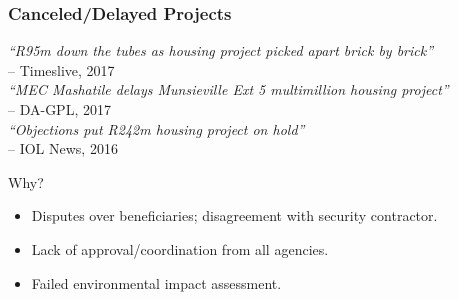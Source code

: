 \documentclass[aspectratio=32]{beamer}
\begin{document}
\begin{frame}
\frametitle{Canceled/Delayed Projects}
\begin{center}

  {\footnotesize
{\it ``R95m down the tubes as housing project picked apart brick by brick''} \\ \hspace{20em}-- Timeslive, 2017 \\[.7em]
{\it ``MEC Mashatile delays Munsieville Ext 5 multimillion housing project''} \\ \hspace{20em}-- DA-GPL, 2017 \\[.7em]
{\it ``Objections put R242m housing project on hold''}\\ \hspace{20em}-- IOL News, 2016 \\[.3em]
}
\end{center}
Why?
\begin{itemize}
\item Disputes over beneficiaries; disagreement with security contractor.
\item Lack of  approval/coordination from all agencies.
\item Failed environmental impact assessment.
\end{itemize}
\end{frame}
%
%
%
\end{document}
